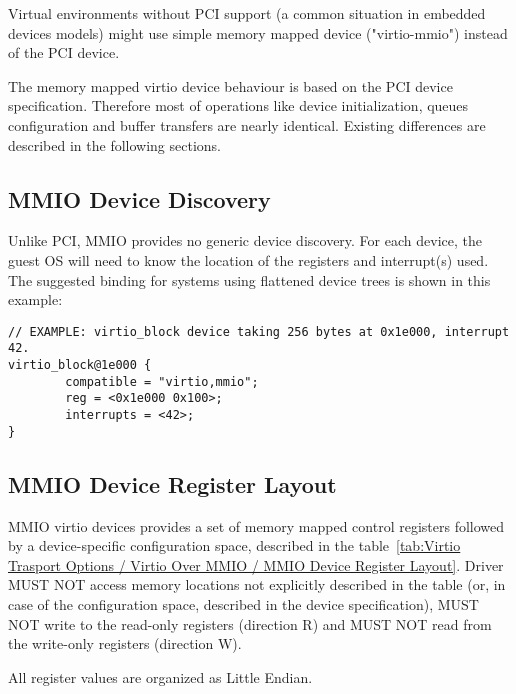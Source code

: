 Virtual environments without PCI support (a common situation in
embedded devices models) might use simple memory mapped device
("virtio-mmio") instead of the PCI device.

The memory mapped virtio device behaviour is based on the PCI
device specification. Therefore most of operations like device
initialization, queues configuration and buffer transfers are
nearly identical. Existing differences are described in the
following sections.

\subsection{MMIO Device Discovery}\label{sec:Virtio Transport Options / Virtio Over MMIO / MMIO Device Discovery}

Unlike PCI, MMIO provides no generic device discovery.  For each
device, the guest OS will need to know the location of the registers
and interrupt(s) used.  The suggested binding for systems using
flattened device trees is shown in this example:

\begin{lstlisting}
// EXAMPLE: virtio_block device taking 256 bytes at 0x1e000, interrupt 42.
virtio_block@1e000 {
        compatible = "virtio,mmio";
        reg = <0x1e000 0x100>;
        interrupts = <42>;
}
\end{lstlisting}

\subsection{MMIO Device Register Layout}\label{sec:Virtio Transport Options / Virtio Over MMIO / MMIO Device Register Layout}

MMIO virtio devices provides a set of memory mapped control
registers followed by a device-specific configuration space,
described in the table~\ref{tab:Virtio Trasport Options / Virtio Over MMIO / MMIO Device Register Layout}.
Driver MUST NOT access memory locations not explicitly described in the
table (or, in case of the configuration space, described in the device specification),
MUST NOT write to the read-only registers (direction R) and
MUST NOT read from the write-only registers (direction W).

All register values are organized as Little Endian.


\newcommand{\mmioreg}[5]{%
  {\bf#1} \newline #3 \newline #4 & {\bf#2} \newline #5 \\
}

